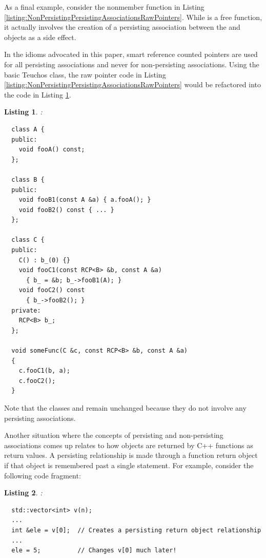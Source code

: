 \documentclass[pdf,ps2pdf,11pt]{SANDreport}
\newtheorem{listing}{Listing}
\begin{document}
As a final example, consider the nonmember function
{} in Listing
{}\ref{listing:NonPersistingPersistingAssociationsRawPointers}.  While
{} is a free function, it actually involves the
creation of a persisting association between the {} and
{} objects as a side effect.

In the idioms advocated in this paper, smart reference counted
pointers are used for all persisting associations and never for
non-persisting associations.  Using the basic Teuchos {}
class, the raw pointer code in Listing
{}\ref{listing:NonPersistingPersistingAssociationsRawPointers} would
be refactored into the code in Listing
{}\ref{listing:NonPersistingPersistingAssociationsRCP}.

\begin{listing}:\\
\label{listing:NonPersistingPersistingAssociationsRCP}
{\small\begin{verbatim}
  class A {
  public:
    void fooA() const;
  };

  class B {
  public:
    void fooB1(const A &a) { a.fooA(); }
    void fooB2() const { ... }
  };

  class C {
  public:
    C() : b_(0) {}
    void fooC1(const RCP<B> &b, const A &a)
      { b_ = &b; b_->fooB1(A); }
    void fooC2() const
      { b_->fooB2(); }
  private:
    RCP<B> b_;
  };

  void someFunc(C &c, const RCP<B> &b, const A &a)
  {
    c.fooC1(b, a);
    c.fooC2();
  }
\end{verbatim}}
\end{listing}

Note that the classes {} and {} remain unchanged
because they do not involve any persisting associations.

Another situation where the concepts of persisting and non-persisting
associations comes up relates to how objects are returned by C++
functions as return values.  A persisting relationship is made through
a function return object if that object is remembered past a single
statement.  For example, consider the following code fragment:

\begin{listing}:\\
{\small\begin{verbatim}
  std::vector<int> v(n);
  ...
  int &ele = v[0];  // Creates a persisting return object relationship
  ...
  ele = 5;          // Changes v[0] much later!
\end{verbatim}}
\end{listing}
\end{document}
